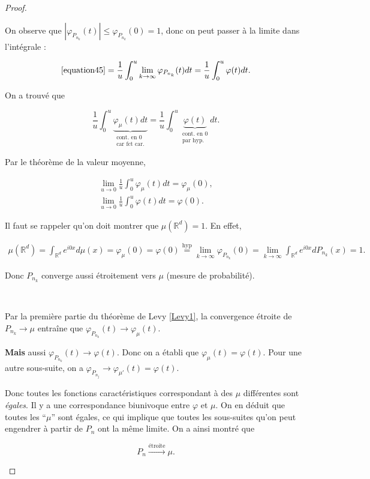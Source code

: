 \documentclass[french]{book}
\theoremstyle{definition}
\theoremstyle{remark}
\begin{document}
\begin{proof}
\begin{enumerate}
    On observe que \(\left\lvert \varphi_{P_{n_k}}(t) \right\rvert \leq \varphi _{P _{n_k}}(0) = 1\), donc on peut passer à la limite dans l'intégrale :

    \begin{gather*}
      \ref{equation45} = \frac{1}{u} \int_{0}^{u} \lim_{k \to \infty}  \varphi _{P _{n_k}}(t)dt = \frac{1}{u} \int_{0}^{u} \varphi(t)dt.
    \end{gather*}

    On a trouvé que

    \[\frac{1}{u}\int_{0}^{u} \underbrace{\varphi_\mu(t)dt}_{\substack{\text{cont. en 0} \\ \text{car fct car.}}} = \frac{1}{u} \int_{0}^{u} \underbrace{\varphi(t)}_{\substack{\text{cont. en 0}\\ \text{par hyp.}}}dt. \]

    Par le théorème de la valeur moyenne,

    \begin{gather*}
      \lim_{u \to 0}\frac{1}{u} \int_{0}^{u} \varphi_\mu(t)dt = \varphi_\mu(0),\\
      \lim_{u \to 0}\frac{1}{u} \int_{0}^{u} \varphi(t)dt = \varphi(0).
    \end{gather*}

    Il faut se rappeler qu'on doit montrer que \(\mu(\mathbb{R}^d) = 1\). En effet,

    \begin{gather*}
      \mu(\mathbb{R}^d) = \int_{\mathbb{R}^d}e^{i0x} d \mu(x) = \varphi_\mu(0) = \varphi(0) \stackrel{\text{hyp}}{=} \lim_{k \to \infty} \varphi _{P _{n_k}}(0) = \lim_{k \to \infty} \int_{\mathbb{R}^d} e^{i 0 x} d P _{n_k}(x) = 1.
    \end{gather*}

    Donc \(P _{n_k}\) converge aussi étroitement vers \(\mu\) (mesure de probabilité).

    \

    Par la première partie du théorème de Levy \ref{Levy1}, la convergence étroite de \(P _{n_k} \longrightarrow \mu\) entraîne que \(\varphi _{P _{n_k}}(t) \longrightarrow \varphi _{\mu}(t)\).

    \textbf{Mais} aussi \(\varphi _{P _{n_k}}(t) \longrightarrow \varphi(t)\). Donc on a établi que \(\varphi_\mu(t) = \varphi(t)\). Pour une autre sous-suite, on a \(\varphi _{P _{n_j}} \longrightarrow \varphi _{\mu'}(t) = \varphi(t)\).

    Donc toutes les fonctions caractéristiques correspondant à des \(\mu\) différentes sont \emph{égales}. Il y a une correspondance biunivoque entre \(\varphi\) et \(\mu\). On en déduit que toutes les ``\(\mu\)'' sont égales, ce qui implique que toutes les sous-suites qu'on peut engendrer à partir de \(P_n\) ont la même limite. On a ainsi montré que

    \[P_n \stackrel{\text{étroite}}{\longrightarrow} \mu.\]
  \end{enumerate}
\end{proof}
\end{document}

